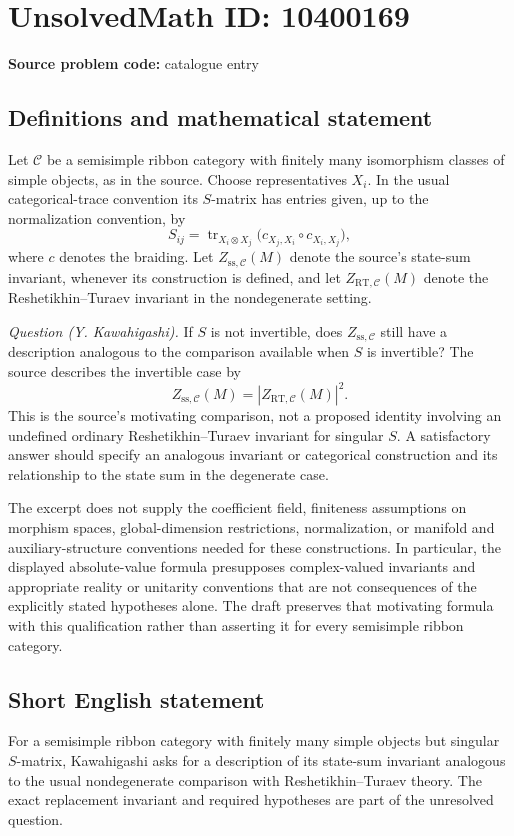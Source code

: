 \documentclass[11pt]{article}
\begin{document}
\section*{UnsolvedMath ID: 10400169}
\textbf{Source problem code:} catalogue entry
\subsection{Definitions and mathematical statement}
Let \(\mathcal C\) be a semisimple ribbon category with finitely many isomorphism classes of simple objects, as in the source. Choose representatives \(X_i\). In the usual categorical-trace convention its \(S\)-matrix has entries given, up to the normalization convention, by
\[
 S_{ij}=\operatorname{tr}_{X_i\otimes X_j}
 \bigl(c_{X_j,X_i}\circ c_{X_i,X_j}\bigr),
\]
where \(c\) denotes the braiding. Let \(Z_{\mathrm{ss},\mathcal C}(M)\) denote the source's state-sum invariant, whenever its construction is defined, and let \(Z_{\mathrm{RT},\mathcal C}(M)\) denote the Reshetikhin--Turaev invariant in the nondegenerate setting.

\emph{Question (Y. Kawahigashi).} If \(S\) is not invertible, does \(Z_{\mathrm{ss},\mathcal C}\) still have a description analogous to the comparison available when \(S\) is invertible? The source describes the invertible case by
\[
 Z_{\mathrm{ss},\mathcal C}(M)
 =\left|Z_{\mathrm{RT},\mathcal C}(M)\right|^2.
\]
This is the source's motivating comparison, not a proposed identity involving an undefined ordinary Reshetikhin--Turaev invariant for singular \(S\). A satisfactory answer should specify an analogous invariant or categorical construction and its relationship to the state sum in the degenerate case.

The excerpt does not supply the coefficient field, finiteness assumptions on morphism spaces, global-dimension restrictions, normalization, or manifold and auxiliary-structure conventions needed for these constructions. In particular, the displayed absolute-value formula presupposes complex-valued invariants and appropriate reality or unitarity conventions that are not consequences of the explicitly stated hypotheses alone. The draft preserves that motivating formula with this qualification rather than asserting it for every semisimple ribbon category.
\subsection{Short English statement}
For a semisimple ribbon category with finitely many simple objects but singular \(S\)-matrix, Kawahigashi asks for a description of its state-sum invariant analogous to the usual nondegenerate comparison with Reshetikhin--Turaev theory. The exact replacement invariant and required hypotheses are part of the unresolved question.
\end{document}
